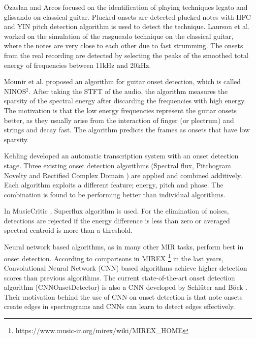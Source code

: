 Özaslan and Arcos \cite{ozaslan2010legato} focused on the identification of playing techniques legato and glissando on classical guitar. Plucked onsets are detected plucked notes with HFC and YIN pitch detection algorithm is used to detect the technique. Laurson et al. \cite{laurson2010simulating} worked on the simulation of the rasgueado technique on the classical guitar, where the notes are very close to each other due to fast strumming. The onsets from the real recording are detected by selecting the peaks of the smoothed total energy of frequencies between 11kHz and 20kHz. 

Mounir et al. \cite{mounir2016guitar} proposed an algorithm for guitar onset detection, which is called NINOS$^2$. After taking the STFT of the audio, the algorithm measures the sparsity of the spectral energy after discarding the frequencies with high energy. The motivation is that the low energy frequencies represent the guitar onsets better, as they usually arise from the interaction of finger (or plectrum) and strings and decay fast. The algorithm predicts the frames as onsets that have low sparsity.

Kehling \cite{kehling2014automatic} developed an automatic transcription system with an onset detection stage. Three existing onset detection algorithms (Spectral flux, Pitchogram Novelty \cite{abesser2017instrument} and Rectified Complex Domain \cite{dixon2006onset}) are applied and combined additively. Each algorithm exploits a different feature; energy, pitch and phase. The combination is found to be performing better than individual algorithms.

In MusicCritic \cite{eremenko2020performance}, Superflux \cite{bock2013maximum} algorithm is used. For the elimination of noises, detections are rejected if the energy difference is less than zero or averaged spectral centroid is more than a threshold. 

Neural network based algorithms, as in many other MIR tasks, perform best in onset detection. According to comparisons in MIREX \cite{mirex} \footnote{https://www.music-ir.org/mirex/wiki/MIREX\_HOME} in the last years, Convolutional Neural Network (CNN) \cite{lecun1998gradient} based algorithms achieve higher detection scores than previous algorithms. The current state-of-the-art onset detection algorithm (CNNOnsetDetector) is also a CNN developed by Schlüter and Böck \cite{schluter2014improved}. Their motivation behind the use of CNN on onset detection is that note onsets create edges in spectrograms and CNNs can learn to detect edges effectively.

